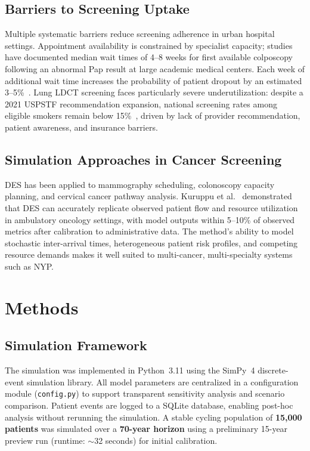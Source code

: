 \documentclass[12pt]{article}
\begin{document}
\subsection{Barriers to Screening Uptake}

Multiple systematic barriers reduce screening adherence in urban hospital
settings.
Appointment availability is constrained by specialist capacity; studies have
documented median wait times of 4--8 weeks for first available colposcopy
following an abnormal Pap result at large academic medical centers.
Each week of additional wait time increases the probability of patient
dropout by an estimated 3--5\%~\cite{bonafede2019}.
Lung LDCT screening faces particularly severe underutilization: despite
a 2021 USPSTF recommendation expansion, national screening rates among
eligible smokers remain below 15\%~\cite{amicizia2025}, driven by lack of
provider recommendation, patient awareness, and insurance barriers.

\subsection{Simulation Approaches in Cancer Screening}

DES has been applied to mammography scheduling, colonoscopy capacity
planning, and cervical cancer pathway analysis.
Kuruppu et al.~\cite{kuruppu2025} demonstrated that DES can accurately
replicate observed patient flow and resource utilization in ambulatory
oncology settings, with model outputs within 5--10\% of observed metrics
after calibration to administrative data.
The method's ability to model stochastic inter-arrival times, heterogeneous
patient risk profiles, and competing resource demands makes it well suited
to multi-cancer, multi-specialty systems such as NYP.

\section{Methods}

\subsection{Simulation Framework}

The simulation was implemented in Python~3.11 using the SimPy~4
discrete-event simulation library.
All model parameters are centralized in a configuration module
(\texttt{config.py}) to support transparent sensitivity analysis and
scenario comparison.
Patient events are logged to a SQLite database, enabling post-hoc
analysis without rerunning the simulation.
A stable cycling population of \textbf{15{,}000 patients} was simulated
over a \textbf{70-year horizon} using a preliminary 15-year preview run
(runtime: $\sim$32 seconds) for initial calibration.
\end{document}
